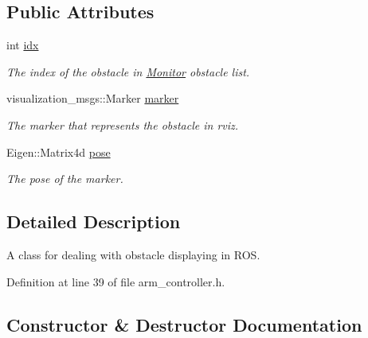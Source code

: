 \subsection*{Public Attributes}
\begin{DoxyCompactItemize}
\item 
int \hyperlink{class_rviz_obstacle_aac6f99fde043e8d9c0e9d0bab32fd375}{idx}\hypertarget{class_rviz_obstacle_aac6f99fde043e8d9c0e9d0bab32fd375}{}\label{class_rviz_obstacle_aac6f99fde043e8d9c0e9d0bab32fd375}

\begin{DoxyCompactList}\small\item\em The index of the obstacle in \hyperlink{class_monitor}{Monitor} obstacle list. \end{DoxyCompactList}\item 
visualization\+\_\+msgs\+::\+Marker \hyperlink{class_rviz_obstacle_a9edb18553236c56fb49e9d181e0ed052}{marker}\hypertarget{class_rviz_obstacle_a9edb18553236c56fb49e9d181e0ed052}{}\label{class_rviz_obstacle_a9edb18553236c56fb49e9d181e0ed052}

\begin{DoxyCompactList}\small\item\em The marker that represents the obstacle in rviz. \end{DoxyCompactList}\item 
Eigen\+::\+Matrix4d \hyperlink{class_rviz_obstacle_aa48c4d1a26938cb932aac1439373b60b}{pose}\hypertarget{class_rviz_obstacle_aa48c4d1a26938cb932aac1439373b60b}{}\label{class_rviz_obstacle_aa48c4d1a26938cb932aac1439373b60b}

\begin{DoxyCompactList}\small\item\em The pose of the marker. \end{DoxyCompactList}\end{DoxyCompactItemize}


\subsection{Detailed Description}
A class for dealing with obstacle displaying in R\+OS. 

Definition at line 39 of file arm\+\_\+controller.\+h.



\subsection{Constructor \& Destructor Documentation}
